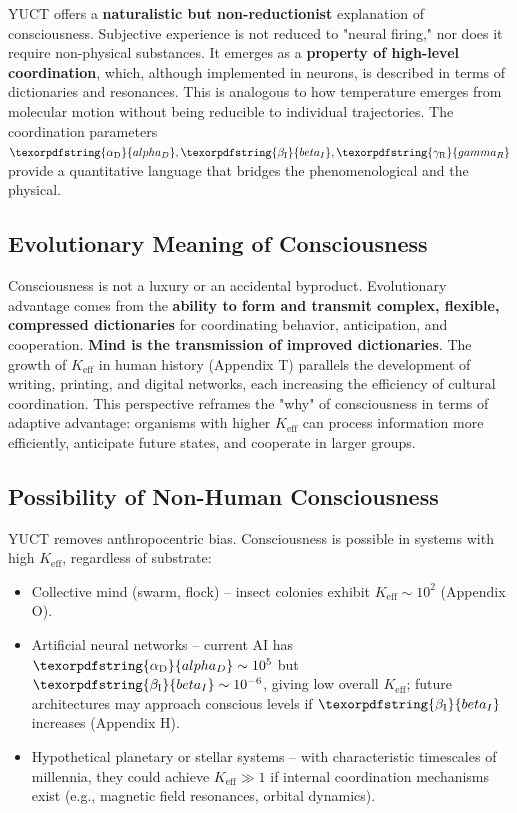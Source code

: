 \documentclass[12pt,a4paper]{article}
\DeclareRobustCommand{\alD}{\texorpdfstring{\ensuremath{\alpha_{\mathrm{D}}}}{alpha_D}}
\DeclareRobustCommand{\beI}{\texorpdfstring{\ensuremath{\beta_{\mathrm{I}}}}{beta_I}}
\DeclareRobustCommand{\gaR}{\texorpdfstring{\ensuremath{\gamma_{\mathrm{R}}}}{gamma_R}}
\newcommand{\eff}{\mathrm{eff}}
\newcommand{\Ke}{K_{\eff}}
\begin{document}
	YUCT offers a \textbf{naturalistic but non-reductionist} explanation of consciousness. Subjective experience is not reduced to "neural firing," nor does it require non-physical substances. It emerges as a \textbf{property of high-level coordination}, which, although implemented in neurons, is described in terms of dictionaries and resonances. This is analogous to how temperature emerges from molecular motion without being reducible to individual trajectories. The coordination parameters $\alD, \beI, \gaR$ provide a quantitative language that bridges the phenomenological and the physical.
	
	\subsection{Evolutionary Meaning of Consciousness}
	
	Consciousness is not a luxury or an accidental byproduct. Evolutionary advantage comes from the \textbf{ability to form and transmit complex, flexible, compressed dictionaries} for coordinating behavior, anticipation, and cooperation. \textbf{Mind is the transmission of improved dictionaries}. The growth of $\Ke$ in human history (Appendix T) parallels the development of writing, printing, and digital networks, each increasing the efficiency of cultural coordination. This perspective reframes the "why" of consciousness in terms of adaptive advantage: organisms with higher $\Ke$ can process information more efficiently, anticipate future states, and cooperate in larger groups.
	
	\subsection{Possibility of Non-Human Consciousness}
	
	YUCT removes anthropocentric bias. Consciousness is possible in systems with high $\Ke$, regardless of substrate:
	\begin{itemize}
		\item Collective mind (swarm, flock) – insect colonies exhibit $\Ke \sim 10^2$ (Appendix O).
		\item Artificial neural networks – current AI has $\alD \sim 10^5$ but $\beI \sim 10^{-6}$, giving low overall $\Ke$; future architectures may approach conscious levels if $\beI$ increases (Appendix H).
		\item Hypothetical planetary or stellar systems – with characteristic timescales of millennia, they could achieve $\Ke \gg 1$ if internal coordination mechanisms exist (e.g., magnetic field resonances, orbital dynamics).
	\end{itemize}
	
\end{document}
